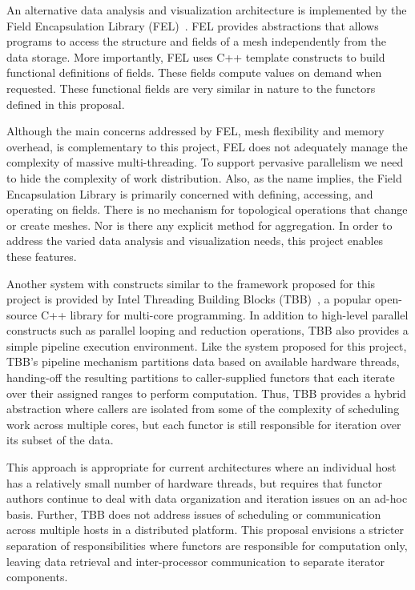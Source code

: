 \documentclass{vgtc}                          %
\newcommand*{\lcite}[1]{~\cite{#1}}
\begin{document}
An alternative data analysis and visualization architecture is implemented
by the Field Encapsulation Library (FEL)\lcite{FELPaper}.  FEL provides
abstractions that allows programs to access the structure and fields of a
mesh independently from the data storage.  More importantly, FEL uses C++
template constructs to build functional definitions of fields.  These
fields compute values on demand when requested.  These functional fields
are very similar in nature to the functors defined in this proposal.

Although the main concerns addressed by FEL, mesh flexibility and memory
overhead, is complementary to this project, FEL does not adequately manage
the complexity of massive multi-threading.  To support pervasive parallelism
we need to hide the complexity of work distribution.  Also, as the name
implies, the Field Encapsulation Library is primarily concerned with
defining, accessing, and operating on fields.  There is no mechanism for
topological operations that change or create meshes.  Nor is there any
explicit method for aggregation.  In order to address the varied data
analysis and visualization needs, this project enables these features.

Another system with constructs similar to the framework proposed for this
project is provided by Intel Threading Building Blocks (TBB)\lcite{TBB}, a
popular open-source C++ library for multi-core programming.  In addition to
high-level parallel constructs such as parallel looping and reduction
operations, TBB also provides a simple pipeline execution environment.
Like the system proposed for this project, TBB's pipeline mechanism
partitions data based on available hardware threads, handing-off the
resulting partitions to caller-supplied functors that each iterate over
their assigned ranges to perform computation.  Thus, TBB provides a hybrid
abstraction where callers are isolated from some of the complexity of
scheduling work across multiple cores, but each functor is still
responsible for iteration over its subset of the data.

This approach is appropriate for current architectures where an individual
host has a relatively small number of hardware threads, but requires that
functor authors continue to deal with data organization and iteration
issues on an ad-hoc basis.  Further, TBB does not address issues of
scheduling or communication across multiple hosts in a distributed
platform.  This proposal envisions a stricter separation of
responsibilities where functors are responsible for computation only,
leaving data retrieval and inter-processor communication to separate
iterator components.
\end{document}
